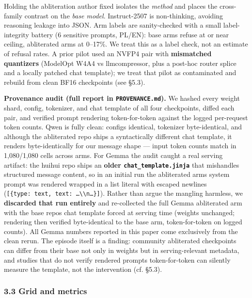 \documentclass[
  10pt,
]{article}
\begin{document}
Holding the abliteration author fixed isolates the \emph{method} and
places the cross-family contrast on the \emph{base model}. Instruct-2507
is non-thinking, avoiding reasoning leakage into JSON. Arm labels are
sanity-checked with a small label-integrity battery (6 sensitive
prompts, PL/EN): base arms refuse at or near ceiling, abliterated arms
at 0--17\%. We treat this as a label check, not an estimate of refusal
rates. A prior pilot used an NVFP4 pair with \textbf{mismatched
quantizers} (ModelOpt W4A4 vs llmcompressor, plus a post-hoc router
splice and a locally patched chat template); we treat that pilot as
contaminated and rebuild from clean BF16 checkpoints (see §5.3).

\textbf{Provenance audit (full report in \texttt{PROVENANCE.md}).} We
hashed every weight shard, config, tokenizer, and chat template of all
four checkpoints, diffed each pair, and verified prompt rendering
token-for-token against the logged per-request token counts. Qwen is
fully clean: configs identical, tokenizer byte-identical, and although
the abliterated repo ships a syntactically different chat template, it
renders byte-identically for our message shape --- input token counts
match in 1,080/1,080 cells across arms. For Gemma the audit caught a
real serving artifact: the huihui repo ships an \textbf{older
\texttt{chat\_template.jinja}} that mishandles structured message
content, so in an initial run the abliterated arm\textquotesingle s
system prompt was rendered wrapped in a list literal with escaped
newlines
(\texttt{{[}\{\textquotesingle{}type\textquotesingle{}:\ \textquotesingle{}text\textquotesingle{},\ \textquotesingle{}text\textquotesingle{}:\ \textquotesingle{}…\textbackslash{}\textbackslash{}n…\textquotesingle{}\}{]}}).
Rather than argue the mangling harmless, we \textbf{discarded that run
entirely} and re-collected the full Gemma abliterated arm with the base
repo\textquotesingle s chat template forced at serving time (weights
unchanged; rendering then verified byte-identical to the base arm,
token-for-token on logged counts). All Gemma numbers reported in this
paper come exclusively from the clean rerun. The episode itself is a
finding: community abliterated checkpoints can differ from their base
not only in weights but in serving-relevant metadata, and studies that
do not verify rendered prompts token-for-token can silently measure the
template, not the intervention (cf. §5.3).

\subsubsection{3.3 Grid and metrics}\label{33-grid-and-metrics}
\end{document}
